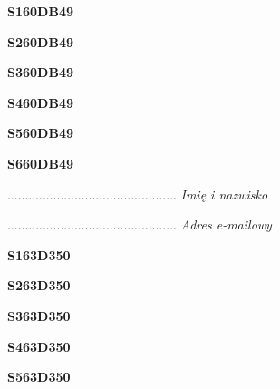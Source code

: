 \begin{turn}{90}\huge \textbf{S160DB49}\end{turn}

\begin{turn}{90}\huge \textbf{S260DB49}\end{turn}

\begin{turn}{90}\huge \textbf{S360DB49}\end{turn}

\begin{turn}{90}\huge \textbf{S460DB49}\end{turn}

\begin{turn}{90}\huge \textbf{S560DB49}\end{turn}

\begin{turn}{90}\huge \textbf{S660DB49}\end{turn}

\begin{turn}{90}\begin{minipage}{\linewidth} \vspace{20mm} ................................................  \textit{Imię i nazwisko}\end{minipage}\end{turn}

\begin{turn}{90}\begin{minipage}{\linewidth} \vspace{20mm} ................................................  \textit{Adres e-mailowy}\end{minipage}\end{turn}

\begin{turn}{90}\huge \textbf{S163D350}\end{turn}

\begin{turn}{90}\huge \textbf{S263D350}\end{turn}

\begin{turn}{90}\huge \textbf{S363D350}\end{turn}

\begin{turn}{90}\huge \textbf{S463D350}\end{turn}

\begin{turn}{90}\huge \textbf{S563D350}\end{turn}

